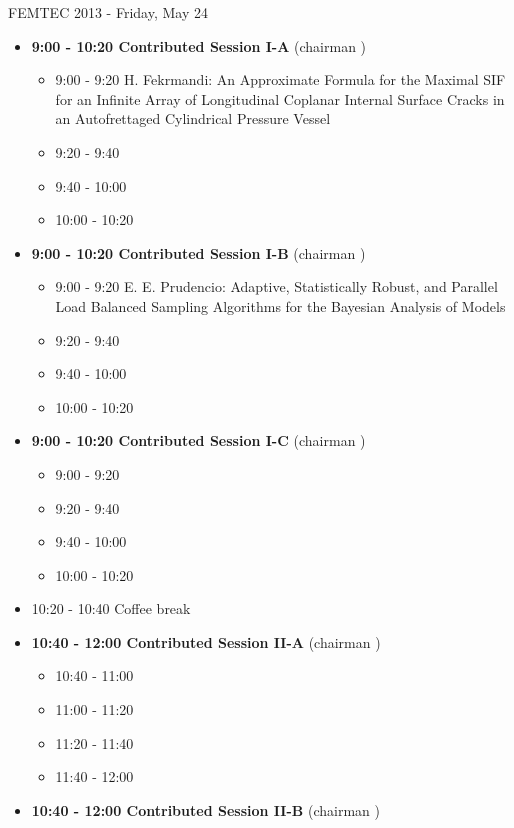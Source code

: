 \documentclass[10pt, A4]{article}%
\begin{document}
\centerline{\huge FEMTEC 2013 - Friday, May 24}
\vspace{4mm}
\begin{itemize}    
\item {\bf 9:00 - 10:20 Contributed Session I-A} (chairman ) 
  \begin{itemize}
    \item 9:00 - 9:20 {H. Fekrmandi}: {An Approximate Formula for the Maximal SIF for an Infinite Array of Longitudinal Coplanar Internal Surface Cracks in an Autofrettaged Cylindrical Pressure Vessel}
    \item 9:20 - 9:40 
    \item 9:40 - 10:00 
    \item 10:00 - 10:20  
  \end{itemize}
  \item {\bf 9:00 - 10:20 Contributed Session I-B} (chairman ) 
  \begin{itemize}
    \item 9:00 - 9:20 {E. E. Prudencio}: {Adaptive, Statistically Robust, and Parallel Load Balanced Sampling Algorithms for the Bayesian Analysis of Models}
    \item 9:20 - 9:40 
    \item 9:40 - 10:00 
    \item 10:00 - 10:20      
  \end{itemize}
    \item {\bf 9:00 - 10:20 Contributed Session I-C} (chairman ) 
  \begin{itemize}
    \item 9:00 - 9:20 
    \item 9:20 - 9:40 
    \item 9:40 - 10:00 
    \item 10:00 - 10:20      
  \end{itemize}
  \item 10:20 - 10:40 Coffee break
  \item {\bf 10:40 - 12:00 Contributed Session II-A} (chairman ) 
  \begin{itemize}
    \item 10:40 - 11:00 
    \item 11:00 - 11:20 
    \item 11:20 - 11:40 
    \item 11:40 - 12:00 
  \end{itemize}
  \item {\bf 10:40 - 12:00 Contributed Session II-B} (chairman ) 
  \begin{itemize}

\end{itemize}
\end{itemize}
\end{document}
